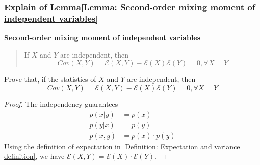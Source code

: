 \documentclass[../concepts.tex]{subfiles}
\begin{document}
\subsubsection{Explain of Lemma\ref{Lemma: Second-order mixing moment of independent variables}}
\textbf{Second-order mixing moment of independent variables}
\begin{quote}
    If $X$ and $Y$ are independent, then
    \begin{equation*}
        Cov(X, Y) =
        \mathcal{E}(X, Y) - \mathcal{E}(X) \mathcal{E}(Y) = 0,
        \forall X \perp Y
    \end{equation*}
\end{quote}

Prove that, if the statistics of $X$ and $Y$ are independent, then
\begin{equation*}
    Cov(X, Y) =
    \mathcal{E}(X, Y) - \mathcal{E}(X) \mathcal{E}(Y) = 0,
    \forall X \perp Y
\end{equation*}

\begin{proof}
    The independency guarantees
    \begin{align*}
        p(x|y)  & = p(x)            \\
        p(y|x)  & = p(y)            \\
        p(x, y) & = p(x) \cdot p(y)
    \end{align*}
    Using the definition of expectation in \eqref{Definition: Expectation and variance definition},
    we have $\mathcal{E}(X, Y) = \mathcal{E}(X) \cdot \mathcal{E}(Y)$.
\end{proof}

\end{document}
